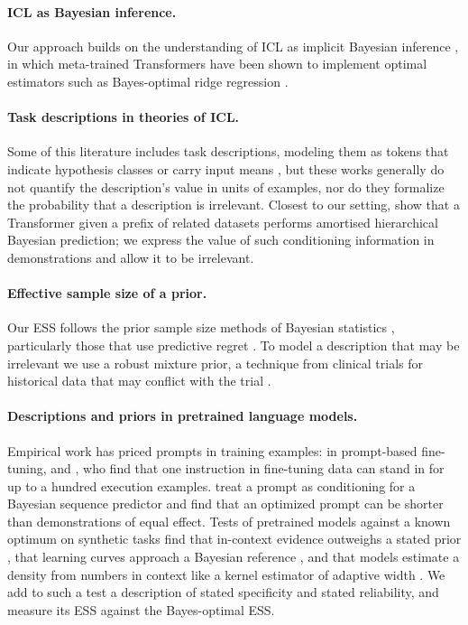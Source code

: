 \documentclass{article}
\begin{document}
\paragraph{ICL as Bayesian inference.} Our approach builds on the understanding of ICL as implicit Bayesian inference \citep{xie2022}, in which meta-trained Transformers have been shown to implement optimal estimators such as Bayes-optimal ridge regression \citep{akyurek2023, raventos2023, panwar2024}.

\paragraph{Task descriptions in theories of ICL.} Some of this literature includes task descriptions, modeling them as tokens that indicate hypothesis classes or carry input means \citep{huangge2025, lin2025, tong2026, lin2024}, but these works generally do not quantify the description's value in units of examples, nor do they formalize the probability that a description is irrelevant. Closest to our setting, \citet{zhu2026} show that a Transformer given a prefix of related datasets performs amortised hierarchical Bayesian prediction; we express the value of such conditioning information in demonstrations and allow it to be irrelevant.

\paragraph{Effective sample size of a prior.} Our ESS follows the prior sample size methods of Bayesian statistics \citep{morita2008, reimherr2021, neuenschwander2020}, particularly those that use predictive regret \citep{reznik2026}. To model a description that may be irrelevant we use a robust mixture prior, a technique from clinical trials for historical data that may conflict with the trial \citep{schmidli2014}.

\paragraph{Descriptions and priors in pretrained language models.} Empirical work has priced prompts in training examples: \citet{lescao2021} in prompt-based fine-tuning, and \citet{cook2026}, who find that one instruction in fine-tuning data can stand in for up to a hundred execution examples. \citet{wenliang2025} treat a prompt as conditioning for a Bayesian sequence predictor and find that an optimized prompt can be shorter than demonstrations of equal effect. Tests of pretrained models against a known optimum on synthetic tasks find that in-context evidence outweighs a stated prior \citep{gupta2025}, that learning curves approach a Bayesian reference \citep{akata2026}, and that models estimate a density from numbers in context like a kernel estimator of adaptive width \citep{liu2025}. We add to such a test a description of stated specificity and stated reliability, and measure its ESS against the Bayes-optimal ESS.
\end{document}
